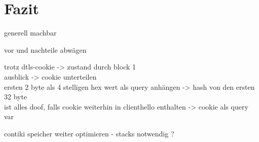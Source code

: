 \chapter{Fazit}

generell machbar

vor und nachteile abwägen

trotz dtls-cookie -> zustand durch block 1\\
ausblick -> cookie unterteilen\\
ersten 2 byte als 4 stelligen hex wert als query anhängen -> hash von den ersten 32 byte\\
ist alles doof, falls cookie weiterhin in clienthello enthalten -> cookie als query var

contiki speicher weiter optimieren - stacks notwendig ?